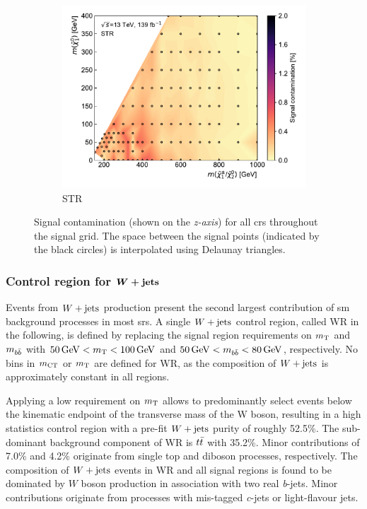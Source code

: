 \begin{figure}
\begin{subfigure}[b]{0.5\linewidth}
		\centering\includegraphics[width=1.0\textwidth]{signal_contamination/plot_STR}
		\caption{STR\label{fig:signal_contaminations_STCR}}
	\end{subfigure}\hfill

	\caption{Signal contamination (shown on the \textit{z-axis}) for all \glspl{cr} throughout the signal grid. The space between the signal points (indicated by the black circles) is interpolated using Delaunay triangles.}
	\label{fig:signal_contamination_CR}
\end{figure}

\subsubsection[Control region for $\wjets$]{Control region for $\boldsymbol{W+\mathrm{jets}}$}

Events from $\wjets$ production present the second largest contribution of \gls{sm} background processes in most \glspl{sr}.
A single $\wjets$ control region, called WR in the following, is defined by replacing the signal region requirements on $m_{\textrm{T}}$ and $m_{b\bar{b}}$ with $\SI{50}{\GeV} < \mt < \SI{100}{\GeV}$  and $\SI{50}{\GeV} < \mbb < \SI{80}{\GeV}$, respectively.
No bins in $m_{\textrm{CT}}$ or $m_{\textrm{T}}$ are defined for WR, as the composition of $\wjets$ is approximately constant in all regions.

Applying a low requirement on $m_{\textrm{T}}$ allows to predominantly select events below the kinematic endpoint of the transverse mass of the W boson, resulting in a high statistics control region with a pre-fit $\wjets$ purity of roughly 52.5\%.
The sub-dominant background component of WR is $t\bar{t}$ with 35.2\%.
Minor contributions of 7.0\% and 4.2\% originate from single top and diboson processes, respectively.
The composition of $\wjets$ events in WR and all signal regions is found to be dominated by $W$ boson production in association with two real \textit{b}-jets.
Minor contributions originate from processes with mis-tagged \textit{c}-jets or light-flavour jets.

